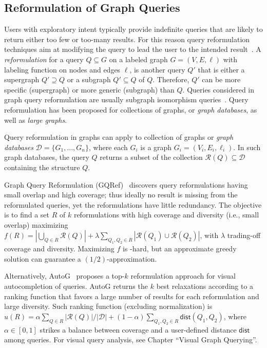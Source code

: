 

\subsection{Reformulation of Graph Queries}

\noindent Users with exploratory intent typically provide indefinite queries that are likely to return either too few or too-many results. 
For this reason query reformulation techniques aim at modifying the query to lead the user to the intended result~\citep{mottin2015graph,hurtado2008query,islam2015efficient}. 
A \emph{reformulation} for a query $Q \subseteq G$ on a labeled graph $G = (V, E, \ell)$ with labeling function on nodes and edges $\ell$, is another query $Q'$ that is either a supergraph $Q' \supseteq Q$ or a subgraph $Q' \subseteq Q$ of $Q$. Therefore, $Q'$ can be more specific (supergraph) or more generic (subgraph) than $Q$. 
Queries considered in graph query reformulation are usually subgraph isomorphism queries~\citep{lee2012depth}.  
Query reformulation has been proposed for collections of graphs, or \emph{graph databases}, as well as \emph{large graphs}. 

Query reformulation in graphs can apply to collection of graphs or \emph{graph databases} $\mathcal{D} = \{G_1, ..., G_n\}$, where each $G_i$ is a graph $G_i = (V_i, E_i, \ell_i)$. 
In such graph databases, the query $Q$ returns a subset of the collection $\mathcal{R}(Q) \subseteq \mathcal{D}$ containing the structure $Q$. 

Graph Query Reformulation (GQRef)~\citep{mottin2015graph} discovers query reformulations having small overlap and high coverage; thus ideally no result is missing from the reformulated queries, yet the reformulations have little redundancy. 
The objective is to find a set $R$ of $k$ reformulations with high coverage and diversity (i.e., small overlap)  maximizing $f(R) = |\bigcup_{Q \in R}\mathcal{R}(Q)|+ \lambda\sum_{Q_1,Q_2 \in R}|\mathcal{R}(Q_1) \cup \mathcal{R}(Q_2)|$, with $\lambda$ trading-off coverage and diversity. 
Maximizing $f$ is \NP-hard, but an approximate greedy solution can guarantee a $(1/2)$-approximation. 

Alternatively, AutoG~\citep{yi2017autog} proposes a top-$k$ reformulation approach for visual autocompletion of queries. 
AutoG returns the $k$ best relaxations according to a ranking function that favors a large number of results for each reformulation and large diversity. 
Such ranking function (excluding normalization) is $u(R) = \alpha \sum_{Q \in R}|\mathcal{R}(Q)|/|\mathcal{D}| + (1-\alpha) \sum_{Q_1, Q_2 \in R} \mathsf{dist}(Q_1, Q_2)$, where  $\alpha \in [0,1]$ strikes a balance between coverage and a user-defined distance $\mathsf{dist}$ among queries. For visual query analysis, 
see Chapter ``Visual Graph Querying''. 




